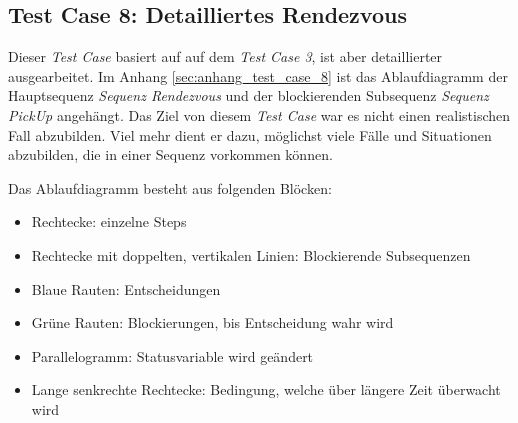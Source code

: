 \subsection{Test Case 8: Detailliertes Rendezvous}
Dieser \textit{Test Case} basiert auf auf dem \textit{Test Case 3}, ist aber detaillierter ausgearbeitet.
Im Anhang \ref{sec:anhang_test_case_8} ist das Ablaufdiagramm der Hauptsequenz \textit{Sequenz Rendezvous} und der blockierenden Subsequenz \textit{Sequenz PickUp} angehängt.
Das Ziel von diesem \textit{Test Case} war es nicht einen realistischen Fall abzubilden.
Viel mehr dient er dazu, möglichst viele Fälle und Situationen abzubilden, die in einer Sequenz vorkommen können.


Das Ablaufdiagramm besteht aus folgenden Blöcken:
\begin{itemize}
\item Rechtecke: einzelne Steps
\item Rechtecke mit doppelten, vertikalen Linien: Blockierende Subsequenzen
\item Blaue Rauten: Entscheidungen
\item Grüne Rauten: Blockierungen, bis Entscheidung wahr wird
\item Parallelogramm: Statusvariable wird geändert
\item Lange senkrechte Rechtecke: Bedingung, welche über längere Zeit überwacht wird
\end{itemize}




